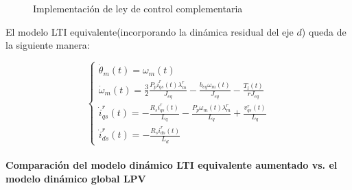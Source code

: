\documentclass[a4paper, 10pt, onecolumn,journal]{ieeeconf}
\begin{document}
\begin{figure}[thpb]
	\centering
	\begin{adjustbox}{max width=\columnwidth}
	\end{adjustbox}
	\caption{Implementación de ley de control complementaria}
	\label{Implementación de ley de control complementaria}
\end{figure}

El modelo LTI equivalente(incorporando la dinámica residual del eje $d$) queda de la siguiente manera:

\begin{equation}
	\begin{cases}
		\dot{\theta}_m(t) = {\omega}_m(t)\\
		\dot{\omega}_m(t) = \frac{3}{2} \frac{P_p i^r_{qs}(t)\lambda^r_m}{J_{eq}} - \frac{b_{eq}\omega_m(t)}{J_{eq}} - \frac{T_l(t)}{r J_{eq}}\\
		\dot{i}^r_{qs}(t) = -\frac{R_s i^r_{qs}(t)}{L_q} - \frac{P_p \omega_m(t) \lambda^r_m}{L_q}+ \frac{v^r_{qs}(t)}{L_q}\\
		\dot{i}^r_{ds}(t) = -\frac{R_s i^r_{ds}(t)}{L_d}	
	\end{cases}
	\label{equaciones modelo LTI eq}
\end{equation}
\paragraph{\textbf{Comparación del modelo dinámico LTI equivalente aumentado vs. el modelo dinámico global LPV}}
\end{document}
